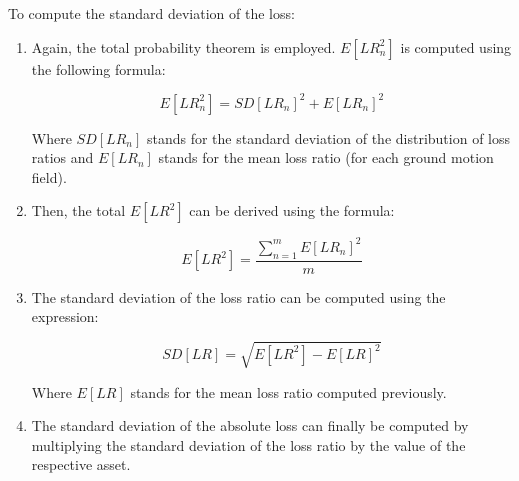 To compute the standard deviation of the loss:

\begin{enumerate}

\item Again, the total probability theorem is employed. $E[LR_n^2]$ is computed using the following formula:

\begin{equation}
E[LR_n^2]=SD[LR_n]^2+E[LR_n]^2
\end{equation}

Where $SD[LR_n]$ stands for the standard deviation of the distribution of loss ratios and $E[LR_n]$ stands for the mean loss ratio (for each ground motion field).

\item Then, the total $E[LR^2]$ can be derived using the formula:

\begin{equation}
E[LR^2]=\frac{\sum_{n=1}^m E[LR_n]^2}{m}
\end{equation}

\item The standard deviation of the loss ratio can be computed using the expression:

\begin{equation}
SD[LR]=\sqrt{E[LR^2]-E[LR]^2}
\end{equation}

Where $E[LR]$ stands for the mean loss ratio computed previously.

\item The standard deviation of the absolute loss can finally be computed by multiplying the standard deviation of the loss ratio by the value of the respective asset.

\end{enumerate}